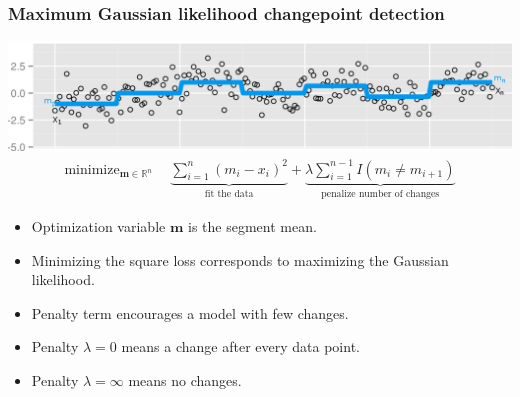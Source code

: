 \documentclass{beamer}
\DeclareMathOperator*{\minimize}{minimize}
\newcommand{\RR}{\mathbb R}
\begin{document}
\begin{frame}
  \frametitle{Maximum Gaussian likelihood changepoint detection}

\includegraphics[width=\textwidth]{seg-mean}
\begin{align*}
    \minimize_{
  \mathbf m\in\RR^{n}
} &\ \ 
    \underbrace{
    \sum_{i=1}^n ( m_i - x_i)^2
}_{\text{fit the data}} + 
\underbrace{\lambda
\sum_{i=1}^{n-1} I(m_i\neq m_{i+1})}_{
\text{penalize number of changes}
}
\end{align*}

\begin{itemize}
\item Optimization variable $\mathbf m$ is the segment mean.
\item Minimizing the square loss corresponds to maximizing the
  Gaussian likelihood.
\item Penalty term encourages a model with few changes.
\item Penalty $\lambda=0$ means a change after every data point.
\item Penalty $\lambda=\infty$ means no changes.
\end{itemize}
\end{frame}
\end{document}
